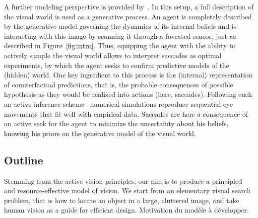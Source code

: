 A further modeling perspective is provided by~\cite{Friston12}. In this setup, a full description of the visual world is used as a generative process. An agent is completely described by the generative model governing the dynamics of its internal beliefs and is interacting with this image by scanning it through a foveated sensor, just as described in Figure~\ref{fig:intro}. Thus, equipping the agent with the ability to actively sample the visual world %
allows to interpret saccades as optimal experiments, by which the agent seeks to confirm predictive models of the (hidden) world. One key ingredient to this process is the (internal) representation of counterfactual predictions, that is, the probable consequences of possible hypothesis as they would be realized into actions (here, saccades). Following such an active inference scheme~\cite{Mirza18} numerical simulations reproduce sequential eye movements that fit well with empirical data. %
Saccades %
are here a consequence of an active seek for the agent to minimize the uncertainty about his beliefs, knowing his priors on the generative model of the visual world.

\subsection{Outline}


Stemming from the active vision principles, our aim is to produce a principled and resource-effective model of vision.
We start from an elementary visual search problem, that is how to locate an object in a large, cluttered image, and take human vision as a guide for efficient design.  {\color{green} Motivation du modèle à développer. }

